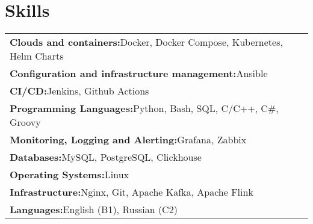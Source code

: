 \documentclass[a4paper,12pt]{article}
\begin{document}
    \section{Skills}
    \renewcommand{\arraystretch}{1.2}
    \begin{tabularx}{\linewidth}{@{}l X@{}}
        \textbf{Clouds and containers:}\quad Docker, \quad Docker Compose, \quad Kubernetes, \quad Helm Charts \\
        \textbf{Configuration and infrastructure management:}\quad Ansible \\
        \textbf{CI/CD:}\quad Jenkins, \quad Github Actions \\
        \textbf{Programming Languages:}\quad Python, \quad Bash, \quad SQL, \quad C/C++, \quad C\#, \quad Groovy \\
        \textbf{Monitoring, Logging and Alerting:}\quad Grafana, \quad Zabbix \\
        \textbf{Databases:}\quad MySQL, \quad PostgreSQL, \quad Clickhouse \\
        \textbf{Operating Systems:}\quad Linux \\
        \textbf{Infrastructure:}\quad Nginx, \quad Git, \quad Apache Kafka, \quad Apache Flink \\
        \textbf{Languages:}\quad English (B1), \quad Russian (C2) \\
    \end{tabularx}
\end{document}
